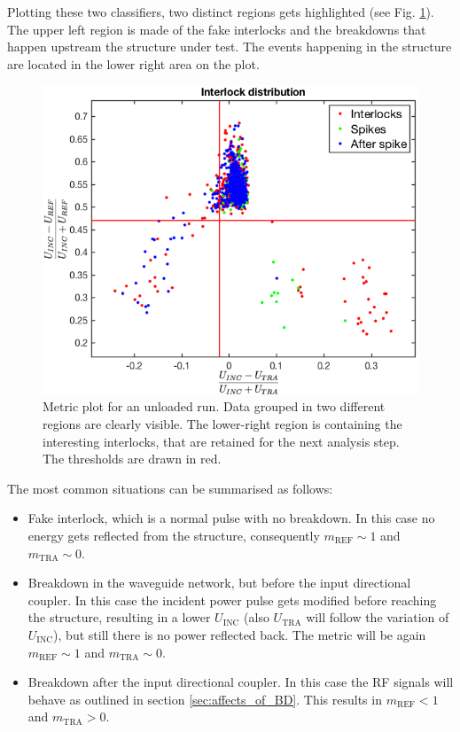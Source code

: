 Plotting these two classifiers, two distinct regions gets highlighted (see Fig. \ref{Metric_plot}). The upper left region is made of the fake interlocks and the breakdowns that happen upstream the structure under test. The events happening in the structure are located in the lower right area on the plot. 

\begin{figure}[h]
\centering 
\includegraphics[scale=0.46]{pictures/metric_plt.png}
\caption{Metric plot for an unloaded run. Data grouped in two different regions are clearly visible. The lower-right region is containing the interesting interlocks, that are retained for the next analysis step. The thresholds are drawn in red.}
\label{Metric_plot}
\end{figure}


The most common situations can be summarised as follows:
\begin{itemize}
\item Fake interlock, which is a normal pulse with no breakdown. In this case no energy gets reflected from the structure, consequently $m_\text{REF} \sim 1$ and  $m_\text{TRA} \sim 0$.
\item Breakdown in the waveguide network, but before the input directional coupler. In this case the incident power pulse gets modified before reaching the structure, resulting in a lower $U_\text{INC}$ (also $U_\text{TRA}$ will follow the variation of $U_\text{INC}$), but still there is no power reflected back. The metric will be again $m_\text{REF} \sim 1$ and  $m_\text{TRA} \sim 0$.
\item Breakdown after the input directional coupler. In this case the RF signals will behave as outlined in section \ref{sec:affects_of_BD}. This results in $m_\text{REF} <1$ and  $m_\text{TRA} > 0$.
\end{itemize}

